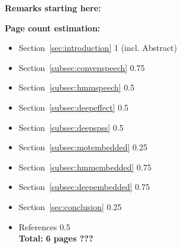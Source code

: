 

\textbf{\Large Remarks starting here:}

\vspace{2em}
\textbf{\large Page count estimation:}
\vspace{1em}
\begin{itemize}[leftmargin=10pt]	
	\item Section~\ref{sec:introduction}\hspace{4em} 			1 \hspace{2em} \textcolor{black!40}{(incl. Abstract)}
	\item Section~\ref{subsec:convenspeech}\hspace{3.35em} 		0.75
	\item Section~\ref{subsec:hmmspeech}\hspace{3.35em} 		0.5
	\item Section~\ref{subsec:deepeffect}\hspace{3.35em}		0.5
	\item Section~\ref{subsec:deepspss}\hspace{3.35em}			0.5
	\item Section~\ref{subsec:motembedded}\hspace{3.35em} 		0.25
	\item Section~\ref{subsec:hmmembedded}\hspace{3.35em} 		0.75
	\item Section~\ref{subsec:deepembedded}\hspace{3.35em} 		0.75
	\item Section~\ref{sec:conclusion}\hspace{4em}				0.25
	\item References\hspace{3.35em}								0.5\\[0.5em]
	\textbf{Total:}\hspace{5.2em} 								\textbf{6 pages ???}
\end{itemize}

